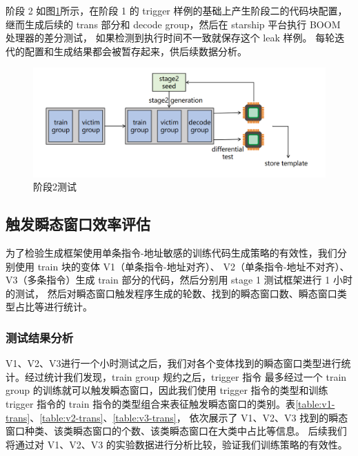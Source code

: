 阶段 2 如图\ref{paper:stage2-test}所示，在阶段 1 的 trigger 样例的基础上产生阶段二的代码块配置，
继而生成后续的 trans 部分和 decode group，然后在 starship 平台执行 BOOM 处理器的差分测试，
如果检测到执行时间不一致就保存这个 leak 样例。
每轮迭代的配置和生成结果都会被暂存起来，供后续数据分析。\par

\begin{figure}[!h]
    \centering
    \includegraphics[width=\linewidth]{figure/paper/stage2-test.png}
    \caption{阶段2测试}
    \label{paper:stage2-test}
\end{figure}

\subsection{触发瞬态窗口效率评估}

为了检验生成框架使用单条指令-地址敏感的训练代码生成策略的有效性，我们分别使用 train 块的变体 V1（单条指令-地址对齐）、
V2（单条指令-地址不对齐）、V3（多条指令）生成 train 部分的代码，然后分别用 stage 1 测试框架进行 1 小时的测试，
然后对瞬态窗口触发程序生成的轮数、找到的瞬态窗口数、瞬态窗口类型占比等进行统计。\par

\subsubsection{测试结果分析}

V1、V2、V3进行一个小时测试之后，我们对各个变体找到的瞬态窗口类型进行统计。经过统计我们发现，train group 规约之后，trigger 指令
最多经过一个 train group 的训练就可以触发瞬态窗口，因此我们使用 trigger 指令的类型和训练 trigger 指令的
train 指令的类型组合来表征触发瞬态窗口的类别。表\ref{table:v1-trans}、\ref{table:v2-trans}、\ref{table:v3-trans}，
依次展示了 V1、V2、V3 找到的瞬态窗口种类、该类瞬态窗口的个数、该类瞬态窗口在大类中占比等信息。
后续我们将通过对 V1、V2、V3 的实验数据进行分析比较，验证我们训练策略的有效性。\par

